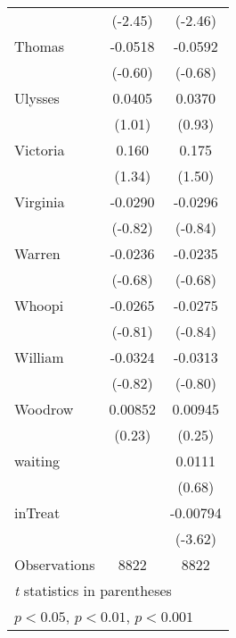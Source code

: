 {\begin{tabular}{l*{2}{c}}
                    &     (-2.45)         &     (-2.46)         \\
[1em]
Thomas              &     -0.0518         &     -0.0592         \\
                    &     (-0.60)         &     (-0.68)         \\
[1em]
Ulysses             &      0.0405         &      0.0370         \\
                    &      (1.01)         &      (0.93)         \\
[1em]
Victoria            &       0.160         &       0.175         \\
                    &      (1.34)         &      (1.50)         \\
[1em]
Virginia            &     -0.0290         &     -0.0296         \\
                    &     (-0.82)         &     (-0.84)         \\
[1em]
Warren              &     -0.0236         &     -0.0235         \\
                    &     (-0.68)         &     (-0.68)         \\
[1em]
Whoopi              &     -0.0265         &     -0.0275         \\
                    &     (-0.81)         &     (-0.84)         \\
[1em]
William             &     -0.0324         &     -0.0313         \\
                    &     (-0.82)         &     (-0.80)         \\
[1em]
Woodrow             &     0.00852         &     0.00945         \\
                    &      (0.23)         &      (0.25)         \\
[1em]
waiting             &                     &      0.0111         \\
                    &                     &      (0.68)         \\
[1em]
inTreat             &                     &    -0.00794\sym{***}\\
                    &                     &     (-3.62)         \\
\hline
Observations        &        8822         &        8822         \\
\hline\hline
\multicolumn{3}{l}{\footnotesize \textit{t} statistics in parentheses}\\
\multicolumn{3}{l}{\footnotesize \sym{*} \(p<0.05\), \sym{**} \(p<0.01\), \sym{***} \(p<0.001\)}\\
\end{tabular}
}
